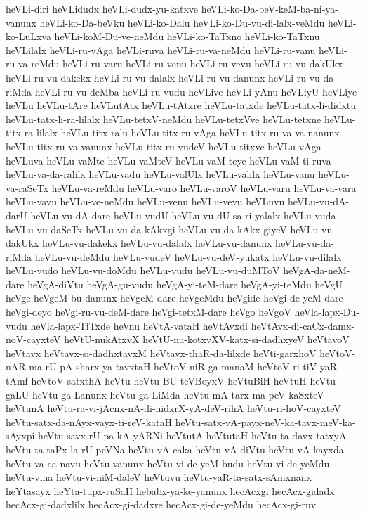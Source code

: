 {heVLi-diri
heVLidudx
heVLi-dudx-yu-katxve
heVLi-ko-Da-beV-keM-ba-ni-ya-vanunx
heVLi-ko-Da-beVku
heVLi-ko-Dalu
heVLi-ko-Du-vu-di-lalx-veMdu
heVLi-ko-LuLxva
heVLi-koM-Du-ve-neMdu
heVLi-ko-TaTxno
heVLi-ko-TaTxnu
heVLilalx
heVLi-ru-vAga
heVLi-ruva
heVLi-ru-va-neMdu
heVLi-ru-vanu
heVLi-ru-va-reMdu
heVLi-ru-varu
heVLi-ru-venu
heVLi-ru-vevu
heVLi-ru-vu-dakUkx
heVLi-ru-vu-dakekx
heVLi-ru-vu-dalalx
heVLi-ru-vu-danunx
heVLi-ru-vu-da-riMda
heVLi-ru-vu-deMba
heVLi-ru-vudu
heVLive
heVLi-yAnu
heVLiyU
heVLiye
heVLu
heVLu-tAre
heVLutAtx
heVLu-tAtxre
heVLu-tatxde
heVLu-tatx-li-didxtu
heVLu-tatx-li-ra-lilalx
heVLu-tetxV-neMdu
heVLu-tetxVve
heVLu-tetxne
heVLu-titx-ra-lilalx
heVLu-titx-ralu
heVLu-titx-ru-vAga
heVLu-titx-ru-va-va-nanunx
heVLu-titx-ru-va-vanunx
heVLu-titx-ru-vudeV
heVLu-titxve
heVLu-vAga
heVLuva
heVLu-vaMte
heVLu-vaMteV
heVLu-vaM-teye
heVLu-vaM-ti-ruva
heVLu-va-da-ralilx
heVLu-vadu
heVLu-valUlx
heVLu-valilx
heVLu-vanu
heVLu-va-raSeTx
heVLu-va-reMdu
heVLu-varo
heVLu-varoV
heVLu-varu
heVLu-va-vara
heVLu-vavu
heVLu-ve-neMdu
heVLu-venu
heVLu-vevu
heVLuvu
heVLu-vu-dA-darU
heVLu-vu-dA-dare
heVLu-vudU
heVLu-vu-dU-sa-ri-yalalx
heVLu-vuda
heVLu-vu-daSeTx
heVLu-vu-da-kAkxgi
heVLu-vu-da-kAkx-giyeV
heVLu-vu-dakUkx
heVLu-vu-dakekx
heVLu-vu-dalalx
heVLu-vu-danunx
heVLu-vu-da-riMda
heVLu-vu-deMdu
heVLu-vudeV
heVLu-vu-deV-yukatx
heVLu-vu-dilalx
heVLu-vudo
heVLu-vu-doMdu
heVLu-vudu
heVLu-vu-duMToV
heVgA-da-neM-dare
heVgA-diVtu
heVgA-gu-vudu
heVgA-yi-teM-dare
heVgA-yi-teMdu
heVgU
heVge
heVgeM-bu-danunx
heVgeM-dare
heVgeMdu
heVgide
heVgi-de-yeM-dare
heVgi-deyo
heVgi-ru-vu-deM-dare
heVgi-tetxM-dare
heVgo
heVgoV
heVla-lapx-Du-vudu
heVla-lapx-TiTxde
heVnu
heVtA-vataH
heVtAvxdi
heVtAvx-di-caCx-damx-noV-cayxteV
heVtU-nukAtxvX
heVtU-nu-kotxvXV-katx-si-dadhxyeV
heVtavoV
heVtavx
heVtavx-si-dadhxtavxM
heVtavx-thaR-da-lilxde
heVti-garxhoV
heVtoV-nAR-ma-rU-pA-sharx-ya-tavxtaH
heVtoV-niR-ga-manaM
heVtoV-ri-tiV-yaR-tAmf
heVtoV-satxthA
heVtu
heVtu-BU-teVBoyxV
heVtuBiH
heVtuH
heVtu-gaLU
heVtu-ga-Lanunx
heVtu-ga-LiMda
heVtu-mA-tarx-ma-peV-kaSxteV
heVtunA
heVtu-ra-vi-jAcnx-nA-di-nidxrX-yA-deV-rihA
heVtu-ri-hoV-cayxteV
heVtu-satx-da-nAyx-vayx-ti-reV-kataH
heVtu-satx-vA-payx-neV-ka-tavx-meV-ka-sAyxpi
heVtu-savx-rU-pa-kA-yARNi
heVtutA
heVtutaH
heVtu-ta-davx-tatxyA
heVtu-ta-taPx-la-rU-peVNa
heVtu-vA-caka
heVtu-vA-diVtu
heVtu-vA-kayxda
heVtu-va-ca-navu
heVtu-vanunx
heVtu-vi-de-yeM-budu
heVtu-vi-de-yeMdu
heVtu-vina
heVtu-vi-niM-daleV
heVtuvu
heVtu-yaR-ta-satx-sAmxnanx
heYtasayx
heYta-tupx-ruSaH
hebabx-ya-ke-yanunx
hecAcxgi
hecAcx-gidadx
hecAcx-gi-dadxlilx
hecAcx-gi-dadxre
hecAcx-gi-de-yeMdu
hecAcx-gi-ruv
}
